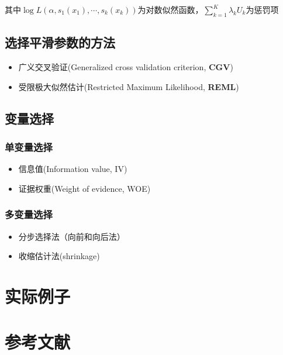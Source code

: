 \documentclass[]{ctexart}
\providecommand{\tightlist}{%
  \setlength{\itemsep}{0pt}\setlength{\parskip}{0pt}}
\begin{document}
其中\(\log L(\alpha, s_1(x_1), \cdots, s_k(x_k))\)为对数似然函数，\(\sum_{k=1}^K\lambda_kU_k\)为惩罚项

\hypertarget{section-5}{%
\subsection{选择平滑参数的方法}\label{section-5}}

\begin{itemize}
\tightlist
\item
  广义交叉验证(Generalized cross validation criterion, \textbf{CGV})
\item
  受限极大似然估计(Restricted Maximum Likelihood, \textbf{REML})
\end{itemize}

\hypertarget{section-6}{%
\subsection{变量选择}\label{section-6}}

\hypertarget{section-7}{%
\subsubsection{单变量选择}\label{section-7}}

\begin{itemize}
\tightlist
\item
  信息值(Information value, IV)
\item
  证据权重(Weight of evidence, WOE)
\end{itemize}

\hypertarget{section-8}{%
\subsubsection{多变量选择}\label{section-8}}

\begin{itemize}
\tightlist
\item
  分步选择法（向前和向后法）
\item
  收缩估计法(shrinkage)
\end{itemize}

\hypertarget{section-9}{%
\section{实际例子}\label{section-9}}

\clearpage

\hypertarget{section-10}{%
\section*{参考文献}\label{section-10}}
\end{document}
